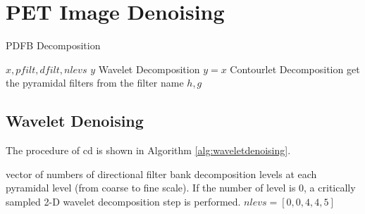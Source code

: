 \section{PET Image Denoising}





\iffalse
\begin{algorithm}
	\caption{Wavelet Denoising}\label{alg:waveletdenoising2}
	\begin{algorithmic}[1]
		\Require $image$
		\Ensure $denoise\_image$
		\Procedure{waveletdenoising($image$)}{}
		\State $\textit{stringlen} \gets \text{length of }\textit{string}$
		\State $i \gets \textit{patlen}$
		\BState \emph{top}:
		\If {$i > \textit{stringlen}$} \Return false
		\EndIf
		\State $j \gets \textit{patlen}$
		\BState \emph{loop}:
		\If {$\textit{string}(i) = \textit{path}(j)$}
		\State $j \gets j-1$.
		\State $i \gets i-1$.
		\State \textbf{goto} \emph{loop}.
		\State \textbf{close};
		\EndIf
		\State $i \gets i+\max(\textit{delta}_1(\textit{string}(i)),\textit{delta}_2(j))$.
		\State \textbf{goto} \emph{top}.
		\EndProcedure
	\end{algorithmic}
\end{algorithm}
\fi

\begin{algorithm}
	\caption{PDFB Decomposition}\label{alg:pdfbdec}
	\begin{algorithmic}[1]
		\Require $x, pfilt, dfilt, nlevs$
		\Ensure $y$
			  \Comment Wavelet Decomposition
				\State $y=x$
			\Else \Comment Contourlet Decomposition
				\State get the pyramidal filters from the filter name \Comment $h, g$
					
			\EndIf
		\EndProcedure
	\end{algorithmic}	
\end{algorithm}


\subsection{Wavelet Denoising}
The procedure of \gls{cd} is shown in Algorithm \ref{alg:waveletdenoising}.


%
vector of numbers of directional filter bank decomposition levels at each pyramidal level (from coarse to fine scale).
If the number of level is 0, a critically sampled 2-D wavelet decomposition step is performed.
$nlevs = [0, 0, 4, 4, 5]$

